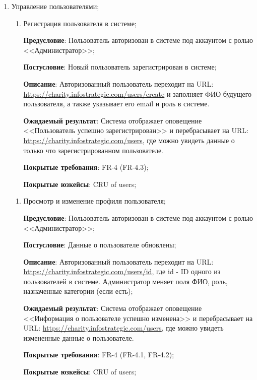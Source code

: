 \begin{enumerate}
    \item Управление пользователями;
    \begin{enumerate}
        \item Регистрация пользователя в системе;
        
        \textbf{Предусловие}: Пользователь авторизован в системе под аккаунтом с ролью <<Администратор>>;
        
        \textbf{Постусловие}: Новый пользователь зарегистрирован в системе;
        
        \textbf{Описание}: Авторизованный пользователь переходит на URL: \url{https://charity.infostrategic.com/users/create} и заполняет ФИО будущего пользователя, а также указывает его email и роль в системе.
        
        \textbf{Ожидаемый результат}: Система отображает оповещение <<Пользователь успешно зарегистрирован>> и перебрасывает на URL:\\ \url{https://charity.infostrategic.com/users}, где можно увидеть данные о только что зарегистрированном пользователе.
        
        \textbf{Покрытые требования}: FR-4 (FR-4.3);
        
        \textbf{Покрытые юзкейсы}: CRU of users;
    \end{enumerate}
    
    \begin{enumerate}
        \item Просмотр и изменение профиля пользователя;
        
        \textbf{Предусловие}: Пользователь авторизован в системе под аккаунтом с ролью <<Администратор>>;
        
        \textbf{Постусловие}: Данные о пользователе обновлены;
        
        \textbf{Описание}: Авторизованный пользователь переходит на URL: \url{https://charity.infostrategic.com/users/id}, где id - ID одного из пользователей в системе. Администратор меняет поля ФИО, роль, назначенные категории (если есть);
        
        \textbf{Ожидаемый результат}: Система отображает оповещение <<Информация о пользователе успешно изменена>> и перебрасывает на URL: \url{https://charity.infostrategic.com/users}, где можно увидеть измененные данные о пользователе.
        
        \textbf{Покрытые требования}: FR-4 (FR-4.1, FR-4.2);
        
        \textbf{Покрытые юзкейсы}: CRU of users;
    \end{enumerate}
    

\end{enumerate}
